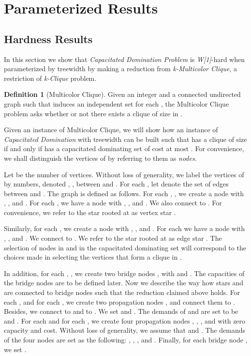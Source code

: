 \documentclass[a4paper,11pt]{article}
\theoremstyle{definition}
\newtheorem{definition}{Definition}
\begin{document}
\section{Parameterized Results} \label{parameterized_results}

\subsection{Hardness Results} \label{section_w_1_hardness}

In this section we show that {\em Capacitated Domination Problem} is {\it W[1]}-hard when parameterized by
treewidth by making a reduction from {\em k-Multicolor Clique}, a
restriction of {\em k-Clique} problem.

\begin{definition}[\sc Multicolor Clique]
Given an integer  and a connected undirected graph  such that  induces an independent set for each , the {\sc Multicolor Clique} problem asks whether or not there exists a clique of size  in .
\end{definition}

Given an instance  of {\sc Multicolor Clique}, we will show how an instance  of {\em Capacitated Domination} with treewidth  can be built such that  has a clique of size  if and only if  has a capacitated dominating set of cost at most . For convenience, we shall distinguish the vertices of  by referring to them as {\em nodes}.

\smallskip

Let  be the number of vertices. Without loss of generality, we label the vertices of  by numbers, denoted , , between  and . For each , let  denote the set of edges between  and . The graph  is defined as follows. For each , , we create a node  with , , and . For each , we have a node  with , , and . We also connect  to . For convenience, we refer to the star rooted at  as vertex star . 

\smallskip

Similarly, for each , we create a node  with , , and . For each  we have a node  with , , and . We connect  to . We refer to the star rooted at  as edge star . The selection of nodes in  and  in the capacitated dominating set will correspond to the choices made in selecting the vertices that form a clique in .

\smallskip

In addition, for each , , we create two bridge nodes ,  with  and . The capacities of the bridge nodes are to be defined later. Now we describe the way how stars  and  are connected to bridge nodes such that the reduction claimed above holds. For each ,  and for each , 
we create two propagation nodes ,  and connect them to . Besides, we connect  to  and  to . We set  and . The demands of  and  are set to be  and . For each  and for each , we create four propagation nodes , , , and  with zero capacity and  cost. Without loss of generality, we assume that  and . The demands of the four nodes are set as the following: , , , and . 
Finally, for each bridge node , we set .
\end{document}
